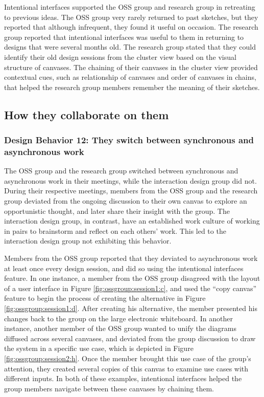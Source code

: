 \documentclass[12pt,fleqn]{ucithesis}
\begin{document}
Intentional interfaces supported the OSS group and research group in retreating to previous ideas. The OSS group very rarely returned to past sketches, but they reported that although infrequent, they found it useful on occasion. The research group reported that intentional interfaces was useful to them in returning to designs that were several months old. The research group stated that they could identify their old design sessions from the cluster view based on the visual structure of canvases. The chaining of their canvases in the cluster view provided contextual cues, such as relationship of canvases and order of canvases in chains, that helped the research group members remember the meaning of their sketches. 

\subsection{How they collaborate on them}

\subsubsection{Design Behavior 12: They switch between synchronous and asynchronous work}

The OSS group and the research group switched between synchronous and asynchronous work in their meetings, while the interaction design group did not. During their respective meetings, members from the OSS group and the research group deviated from the ongoing discussion to their own canvas to explore an opportunistic thought, and later share their insight with the group. The interaction design group, in contrast, have an established work culture of working in pairs to brainstorm and reflect on each others' work. This led to the interaction design group not exhibiting this behavior.

Members from the OSS group reported that they deviated to asynchronous work at least once every design session, and did so using the intentional interfaces feature. 
In one instance, a member from the OSS group disagreed with the layout of a user interface in Figure \ref{fig:ossgroup:session1:c}, and used the ``copy canvas'' feature to begin the process of creating the alternative in Figure \ref{fig:ossgroup:session1:d}. After creating his alternative, the member presented his changes back to the group on the large electronic whiteboard. In another instance, another member of the OSS group wanted to unify the diagrams diffused across several canvases, and deviated from the group discussion to draw the system in a specific use case, which is depicted in Figure \ref{fig:ossgroup:session2:h}. Once the member brought this use case of the group's attention, they created several copies of this canvas to examine use cases with different inputs. In both of these examples, intentional interfaces helped the group members navigate between these canvases by chaining them.
\end{document}
